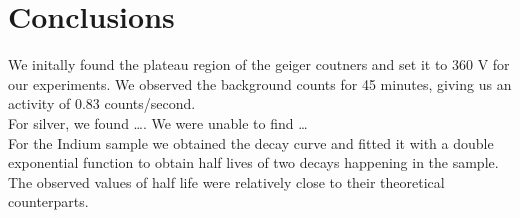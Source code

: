 \documentclass[12pt,a4paper]{article}
\begin{document}
  \section{Conclusions}
    We initally found the plateau region of the geiger coutners and set it to 360 V for our experiments. We observed the background counts for 45 minutes, giving us an activity of 0.83 counts/second. \\
    For silver, we found \dots. We were unable to find \dots\\
    For the Indium sample we obtained the decay curve and fitted it with a double exponential function to obtain half lives of two decays happening in the sample. The observed values of half life were relatively close to their
    theoretical counterparts.
\setcounter{secnumdepth}{0}

\printbibliography
\end{document}
